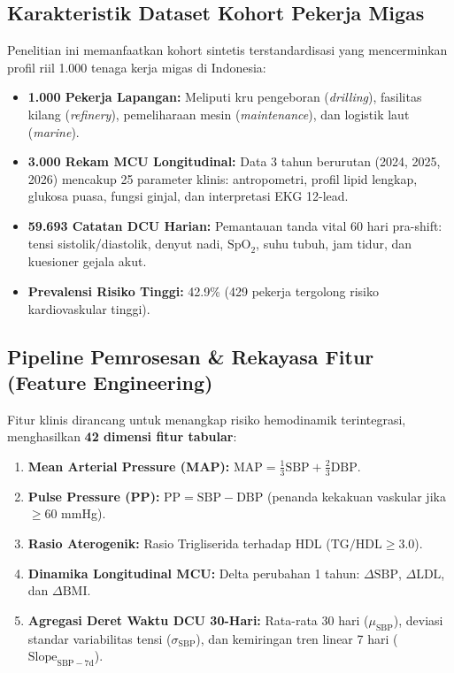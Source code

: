 \documentclass[a4paper,11pt]{article}
\begin{document}
\subsection{Karakteristik Dataset Kohort Pekerja Migas}
Penelitian ini memanfaatkan kohort sintetis terstandardisasi yang mencerminkan profil riil 1.000 tenaga kerja migas di Indonesia:
\begin{itemize}[leftmargin=*]
    \item \textbf{1.000 Pekerja Lapangan:} Meliputi kru pengeboran (\textit{drilling}), fasilitas kilang (\textit{refinery}), pemeliharaan mesin (\textit{maintenance}), dan logistik laut (\textit{marine}).
    \item \textbf{3.000 Rekam MCU Longitudinal:} Data 3 tahun berurutan (2024, 2025, 2026) mencakup 25 parameter klinis: antropometri, profil lipid lengkap, glukosa puasa, fungsi ginjal, dan interpretasi EKG 12-lead.
    \item \textbf{59.693 Catatan DCU Harian:} Pemantauan tanda vital 60 hari pra-shift: tensi sistolik/diastolik, denyut nadi, $\text{SpO}_2$, suhu tubuh, jam tidur, dan kuesioner gejala akut.
    \item \textbf{Prevalensi Risiko Tinggi:} 42.9\% (429 pekerja tergolong risiko kardiovaskular tinggi).
\end{itemize}

\subsection{Pipeline Pemrosesan \& Rekayasa Fitur (Feature Engineering)}
Fitur klinis dirancang untuk menangkap risiko hemodinamik terintegrasi, menghasilkan \textbf{42 dimensi fitur tabular}:
\begin{enumerate}[leftmargin=*]
    \item \textbf{Mean Arterial Pressure (MAP):} $\text{MAP} = \frac{1}{3}\text{SBP} + \frac{2}{3}\text{DBP}$.
    \item \textbf{Pulse Pressure (PP):} $\text{PP} = \text{SBP} - \text{DBP}$ (penanda kekakuan vaskular jika $\ge 60$ mmHg).
    \item \textbf{Rasio Aterogenik:} Rasio Trigliserida terhadap HDL ($\text{TG}/\text{HDL} \ge 3.0$).
    \item \textbf{Dinamika Longitudinal MCU:} Delta perubahan 1 tahun: $\Delta \text{SBP}$, $\Delta \text{LDL}$, dan $\Delta \text{BMI}$.
    \item \textbf{Agregasi Deret Waktu DCU 30-Hari:} Rata-rata 30 hari ($\mu_{\text{SBP}}$), deviasi standar variabilitas tensi ($\sigma_{\text{SBP}}$), dan kemiringan tren linear 7 hari ($\text{Slope}_{\text{SBP}-7\text{d}}$).
\end{enumerate}
\end{document}
